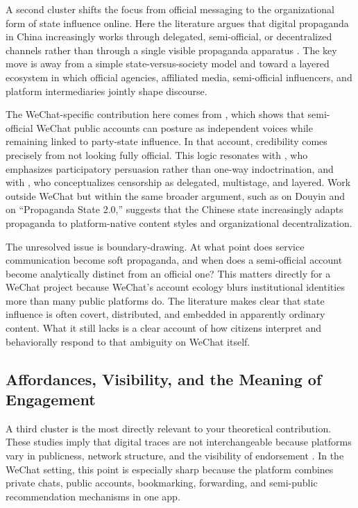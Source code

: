 \documentclass[12pt]{article}
\begin{document}
        A second cluster shifts the focus from official messaging to the organizational form of state influence online. Here the literature argues that digital propaganda in China increasingly works through delegated, semi-official, or decentralized channels rather than through a single visible propaganda apparatus \citep{repnikova_2018_jcc,neagli_2021_journal_of_current_chinese_affairs,sun_2022_politics_society,han_2025_cq,lu_2025_ajps,KingPanRoberts2017,LuPan2021}. The key move is away from a simple state-versus-society model and toward a layered ecosystem in which official agencies, affiliated media, semi-official influencers, and platform intermediaries jointly shape discourse.

        The WeChat-specific contribution here comes from \citet{neagli_2021_journal_of_current_chinese_affairs}, which shows that semi-official WeChat public accounts can posture as independent voices while remaining linked to party-state influence. In that account, credibility comes precisely from not looking fully official. This logic resonates with \citet{repnikova_2018_jcc}, who emphasizes participatory persuasion rather than one-way indoctrination, and with \citet{sun_2022_politics_society}, who conceptualizes censorship as delegated, multistage, and layered. Work outside WeChat but within the same broader argument, such as \citet{lu_2025_ajps} on Douyin and \citet{han_2025_cq} on ``Propaganda State 2.0,'' suggests that the Chinese state increasingly adapts propaganda to platform-native content styles and organizational decentralization.

        The unresolved issue is boundary-drawing. At what point does service communication become soft propaganda, and when does a semi-official account become analytically distinct from an official one? This matters directly for a WeChat project because WeChat's account ecology blurs institutional identities more than many public platforms do. The literature makes clear that state influence is often covert, distributed, and embedded in apparently ordinary content. What it still lacks is a clear account of how citizens interpret and behaviorally respond to that ambiguity on WeChat itself.

        \subsection{Affordances, Visibility, and the Meaning of Engagement}

        A third cluster is the most directly relevant to your theoretical contribution. These studies imply that digital traces are not interchangeable because platforms vary in publicness, network structure, and the visibility of endorsement \citep{jiang_2021_government_information_quarterly,medaglia_2017_government_information_quarterly,wukich_2021_public_performance_management_review,wukich_2022_government_information_quarterly,TsaiMen2018,Xu2022WeChat,tai_2020_journal_of_communication}. In the WeChat setting, this point is especially sharp because the platform combines private chats, public accounts, bookmarking, forwarding, and semi-public recommendation mechanisms in one app.
\end{document}
